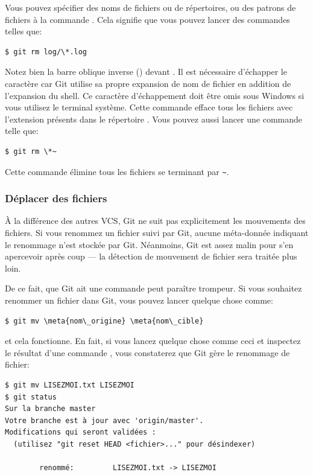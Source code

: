Vous pouvez spécifier des noms de fichiers ou de répertoires, ou des patrons de fichiers à la commande .
Cela signifie que vous pouvez lancer des commandes telles que:
\begin{Schunk}
\begin{Verbatim}
$ git rm log/\*.log
\end{Verbatim}
\end{Schunk}

Notez bien la barre oblique inverse (\code{\bs}) devant \code{*}.
Il est nécessaire d'échapper le caractère \code{*} car Git utilise sa propre expansion de nom de fichier en addition de l'expansion du shell. Ce caractère d'échappement doit être omis sous Windows si vous utilisez le terminal système.
Cette commande efface tous les fichiers avec l'extension  présents dans le répertoire .
Vous pouvez aussi lancer une commande telle que:
\begin{Schunk}
\begin{Verbatim}
$ git rm \*~
\end{Verbatim}
\end{Schunk}

Cette commande élimine tous les fichiers se terminant par \verb=~=.

\subsubsection{Déplacer des fichiers}
\label{sec:git:mv}

À la différence des autres VCS, Git ne suit pas explicitement les mouvements des fichiers.
Si vous renommez un fichier suivi par Git, aucune méta-donnée indiquant le renommage n'est stockée par Git.
Néanmoins, Git est assez malin pour s'en apercevoir après coup --- la détection de mouvement de fichier sera traitée plus loin.

De ce fait, que Git ait une commande  peut paraître trompeur.
Si vous souhaitez renommer un fichier dans Git, vous pouvez lancer quelque chose comme:
\begin{Schunk}
\begin{Verbatim}[commandchars=\\\{\}]
$ git mv \meta{nom\_origine} \meta{nom\_cible}
\end{Verbatim}
\end{Schunk}
et cela fonctionne.
En fait, si vous lancez quelque chose comme ceci et inspectez le résultat d'une commande , vous constaterez que Git gère le renommage de fichier:
\begin{Schunk}
\begin{Verbatim}
$ git mv LISEZMOI.txt LISEZMOI
$ git status
Sur la branche master
Votre branche est à jour avec 'origin/master'.
Modifications qui seront validées :
  (utilisez "git reset HEAD <fichier>..." pour désindexer)

        renommé:         LISEZMOI.txt -> LISEZMOI
\end{Verbatim}
\end{Schunk}

